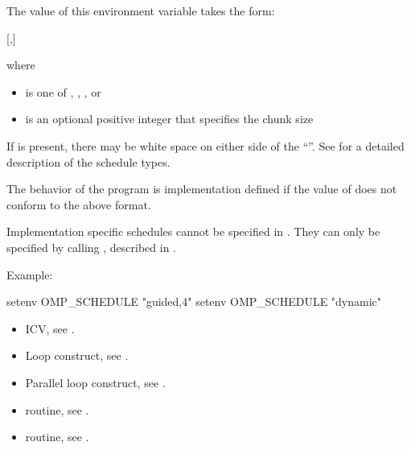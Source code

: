 The value of this environment variable takes the form:

[,]

where

\begin{itemize}
\item {} is one of , , , or 

\item {} is an optional positive integer that specifies the chunk size
\end{itemize}

If  is present, there may be white space on either side of the ``\code{,}''. See 
 for a detailed description of the schedule types.

The behavior of the program is implementation defined if the value of  
does not conform to the above format.

Implementation specific schedules cannot be specified in . They can 
only be specified by calling , described in . 

Example:

\begin{boxedcode}
setenv OMP\_SCHEDULE "guided,4" 
setenv OMP\_SCHEDULE "dynamic"
\end{boxedcode}

\crossreferences
\begin{itemize}
\item {} ICV, see .

\item Loop construct, see .

\item Parallel loop construct, see .

\item {} routine, see .

\item {} routine, see .
\end{itemize}









